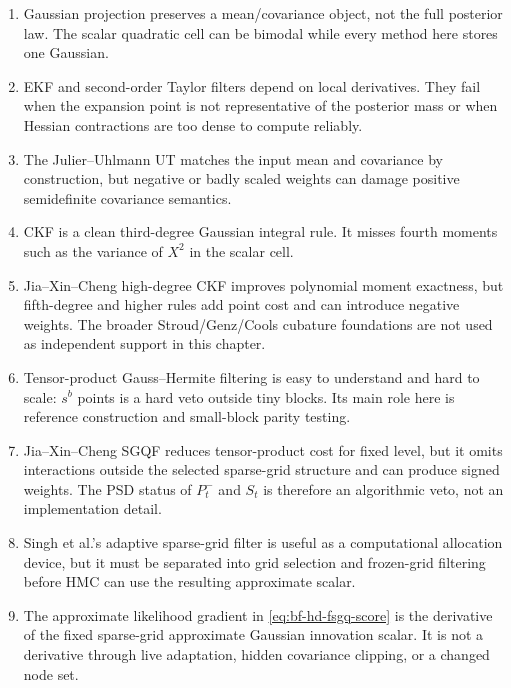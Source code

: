 \begin{enumerate}[label=(\arabic*)]
  \item Gaussian projection preserves a mean/covariance object, not the full
  posterior law.  The scalar quadratic cell can be bimodal while every method
  here stores one Gaussian.
  \item EKF and second-order Taylor filters depend on local derivatives.  They
  fail when the expansion point is not representative of the posterior mass or
  when Hessian contractions are too dense to compute reliably.
  \item The Julier--Uhlmann UT matches the input mean and covariance by
  construction, but negative or badly scaled weights can damage positive
  semidefinite covariance semantics.
  \item CKF is a clean third-degree Gaussian integral rule.  It misses fourth
  moments such as the variance of \(X^2\) in the scalar cell.
  \item Jia--Xin--Cheng high-degree CKF improves polynomial moment exactness,
  but fifth-degree and higher rules add point cost and can introduce negative
  weights.  The broader Stroud/Genz/Cools cubature foundations are not used as
  independent support in this chapter.
  \item Tensor-product Gauss--Hermite filtering is easy to understand and hard
  to scale: \(s^b\) points is a hard veto outside tiny blocks.  Its main role
  here is reference construction and small-block parity testing.
  \item Jia--Xin--Cheng SGQF reduces tensor-product cost for fixed level, but it
  omits interactions outside the selected sparse-grid structure and can produce
  signed weights.  The PSD status of \(P_t^-\) and \(S_t\) is therefore an
  algorithmic veto, not an implementation detail.
  \item Singh et al.'s adaptive sparse-grid filter is useful as a computational
  allocation device, but it must be separated into grid selection and
  frozen-grid filtering before HMC can use the resulting approximate scalar.
  \item The approximate likelihood gradient in
  \eqref{eq:bf-hd-fsgq-score} is the derivative of the fixed sparse-grid
  approximate Gaussian innovation scalar.  It is not a derivative through live
  adaptation, hidden covariance clipping, or a changed node set.
\end{enumerate}

